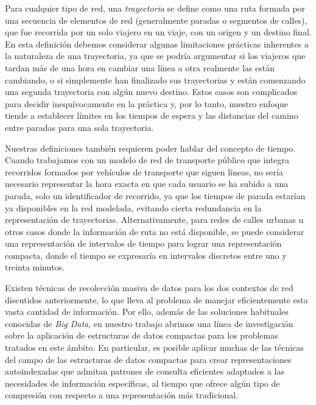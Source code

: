     Para cualquier tipo de red, una \textit{trayectoria} se define como una ruta formada por una secuencia de elementos de red (generalmente paradas o segmentos de calles), que fue recorrida por un solo viajero en un viaje, con un origen y un destino final. En esta definici\'on debemos considerar algunas limitaciones pr\'acticas inherentes a la naturaleza de una trayectoria, ya que se podr\'ia argumentar si los viajeros que tardan m\'as de una hora en cambiar una l\'inea a otra realmente las est\'an cambiando, o si simplemente han finalizado sus trayectorias y est\'an comenzando una segunda trayectoria con alg\'un nuevo destino. Estos casos son complicados para decidir inequ\'ivocamente en la pr\'actica y, por lo tanto, nuestro enfoque tiende a establecer l\'imites en los tiempos de espera y las distancias del camino entre paradas para una sola trayectoria.
    
    Nuestras definiciones tambi\'en requieren poder hablar del concepto de tiempo. Cuando trabajamos con un modelo de red de transporte p\'ublico que integra recorridos formados por veh\'iculos de transporte que siguen l\'ineas, no ser\'ia necesario representar la hora exacta en que cada usuario se ha subido a una parada, solo un identificador de recorrido, ya que los tiempos de parada estar\'ian ya disponibles en la red modelada, evitando cierta redundancia en la representaci\'on de trayectorias.
    Alternativamente, para redes de calles urbanas u otros casos donde la informaci\'on de ruta no est\'a disponible, se puede considerar una representaci\'on de intervalos de tiempo para lograr una representaci\'on compacta, donde el tiempo se expresar\'ia en intervalos discretos entre uno y treinta minutos.
    
    Existen t\'ecnicas de recolecci\'on masiva de datos para los dos contextos de red discutidos anteriormente, lo que lleva al problema de manejar eficientemente esta vasta cantidad de informaci\'on. Por ello, adem\'as de las soluciones habituales conocidas de \textit{Big Data}, en nuestro trabajo abrimos una l\'inea de investigaci\'on sobre la aplicaci\'on de estructuras de datos compactas para los problemas tratados en este \'ambito. En particular, es posible aplicar muchas de las t\'ecnicas del campo de las estructuras de datos compactas para crear representaciones autoindexadas que admitan patrones de consulta eficientes adaptados a las necesidades de informaci\'on espec\'ificas, al tiempo que ofrece alg\'un tipo de compresi\'on con respecto a una representaci\'on m\'as tradicional.
    
